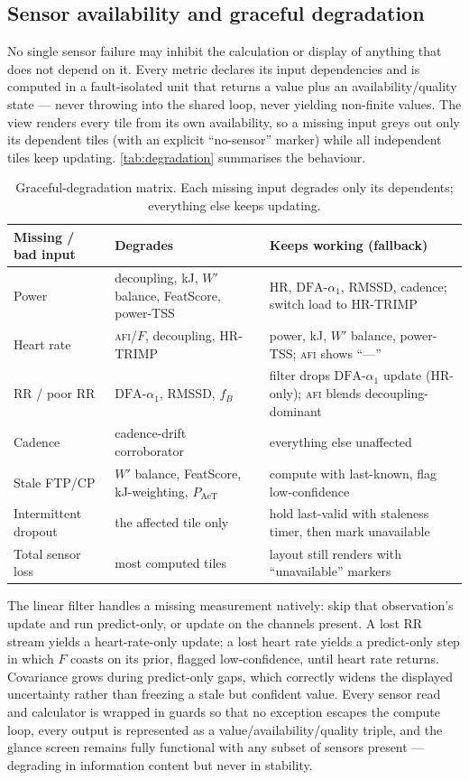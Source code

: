 \documentclass[11pt]{article}
\newcommand{\afi}{\textup{\textsc{afi}}}
\newcommand{\aone}{\ensuremath{\text{DFA-}\alpha_1}}
\newcommand{\Fstate}{\ensuremath{F}}
\begin{document}
\subsection{Sensor availability and graceful degradation}\label{sec:degradation}
No single sensor failure may inhibit the calculation or display of anything that does not depend on it. Every metric declares its input dependencies and is computed in a fault-isolated unit that returns a value plus an availability/quality state --- never throwing into the shared loop, never yielding non-finite values. The view renders every tile from its own availability, so a missing input greys out only its dependent tiles (with an explicit ``no-sensor'' marker) while all independent tiles keep updating. \autoref{tab:degradation} summarises the behaviour.

\begin{table}[h]
\centering
\footnotesize
\caption{Graceful-degradation matrix. Each missing input degrades only its dependents; everything else keeps updating.}
\label{tab:degradation}
\begin{tabularx}{\linewidth}{@{}l X X@{}}
\toprule
\textbf{Missing / bad input} & \textbf{Degrades} & \textbf{Keeps working (fallback)} \\
\midrule
Power & decoupling, kJ, $W'$ balance, FeatScore, power-TSS & HR, $\aone$, RMSSD, cadence; switch load to HR-TRIMP \\
Heart rate & \afi{}/$\Fstate$, decoupling, HR-TRIMP & power, kJ, $W'$ balance, power-TSS; \afi{} shows ``---'' \\
RR / poor RR & $\aone$, RMSSD, $f_B$ & filter drops $\aone$ update (HR-only); \afi{} blends decoupling-dominant \\
Cadence & cadence-drift corroborator & everything else unaffected \\
Stale FTP/CP & $W'$ balance, FeatScore, kJ-weighting, $P_{\text{AeT}}$ & compute with last-known, flag low-confidence \\
Intermittent dropout & the affected tile only & hold last-valid with staleness timer, then mark unavailable \\
Total sensor loss & most computed tiles & layout still renders with ``unavailable'' markers \\
\bottomrule
\end{tabularx}
\end{table}

The linear filter handles a missing measurement natively: skip that observation's update and run predict-only, or update on the channels present. A lost RR stream yields a heart-rate-only update; a lost heart rate yields a predict-only step in which $\Fstate$ coasts on its prior, flagged low-confidence, until heart rate returns. Covariance grows during predict-only gaps, which correctly widens the displayed uncertainty rather than freezing a stale but confident value. Every sensor read and calculator is wrapped in guards so that no exception escapes the compute loop, every output is represented as a value/availability/quality triple, and the glance screen remains fully functional with any subset of sensors present --- degrading in information content but never in stability.
\end{document}
